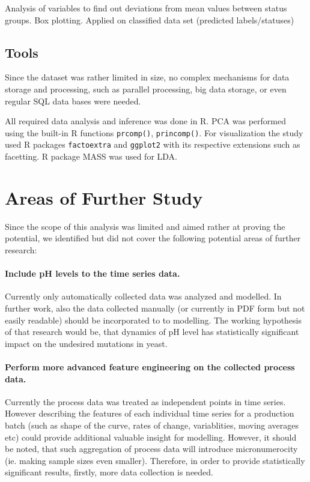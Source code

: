 \documentclass{article}
\begin{document}
Analysis of variables to find out deviations from mean values between status groups. Box plotting.  Applied on classified data set (predicted labels/statuses) 

\subsection{Tools}
Since the dataset was rather limited in size, no complex mechanisms for data storage and processing, such as parallel processing, big data storage, or even regular SQL data bases were needed. 

All required data analysis and inference was done in R. PCA was performed using the built-in R functions \texttt{prcomp()}, \texttt{princomp()}. For visualization the study used R packages \texttt{factoextra} and \texttt{ggplot2} with its respective extensions such as facetting. R package MASS was used for LDA. 







\section{Areas of Further Study}
Since the scope of this analysis was limited and aimed rather at proving the potential, we identified but did not cover the following potential areas of further research:

\paragraph{Include pH levels to the time series data.} Currently only automatically collected data was analyzed and modelled. In further work, also the data collected manually (or currently in PDF form but not easily readable) should be incorporated to to modelling. The working hypothesis of that research would be, that dynamics of pH level has statistically significant impact on the undesired mutations in yeast.
\paragraph{Perform more advanced feature engineering on the collected process data.} Currently the process data was treated as independent points in time series. However describing the features of each individual time series for a production batch (such as shape of the curve, rates of change, variablities, moving averages etc) could provide additional valuable insight for modelling. However, it should be noted, that such aggregation of process data will introduce micronumerocity (ie. making sample sizes even smaller). Therefore, in order to provide statistically significant results, firstly, more data collection is needed.

\appendix

\end{document}
